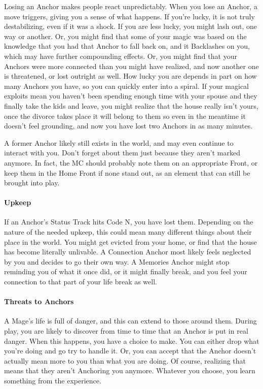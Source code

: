 \documentclass[
]{article}
\begin{document}
Losing an Anchor makes people react unpredictably. When you lose an
Anchor, a move triggers, giving you a sense of what happens. If you're
lucky, it is not truly destabilizing, even if it was a shock. If you are
less lucky, you might lash out, one way or another. Or, you might find
that some of your magic was based on the knowledge that you had that
Anchor to fall back on, and it Backlashes on you, which may have further
compounding effects. Or, you might find that your Anchors were more
connected than you might have realized, and now another one is
threatened, or lost outright as well. How lucky you are depends in part
on how many Anchors you have, so you can quickly enter into a spiral. If
your magical exploits mean you haven't been spending enough time with
your spouse and they finally take the kids and leave, you might realize
that the house really isn't yours, once the divorce takes place it will
belong to them so even in the meantime it doesn't feel grounding, and
now you have lost two Anchors in as many minutes.

A former Anchor likely still exists in the world, and may even continue
to interact with you. Don't forget about them just because they aren't
marked anymore. In fact, the MC should probably note them on an
appropriate Front, or keep them in the Home Front if none stand out, as
an element that can still be brought into play.

\hypertarget{upkeep}{%
\paragraph{Upkeep}\label{upkeep}}

If an Anchor's Status Track hits Code N, you have lost them. Depending
on the nature of the needed upkeep, this could mean many different
things about their place in the world. You might get evicted from your
home, or find that the house has become literally unlivable. A
Connection Anchor most likely feels neglected by you and decides to go
their own way. A Memories Anchor might stop reminding you of what it
once did, or it might finally break, and you feel your connection to
that part of your life break as well.

\hypertarget{threats-to-anchors}{%
\paragraph{Threats to Anchors}\label{threats-to-anchors}}

A Mage's life is full of danger, and this can extend to those around
them. During play, you are likely to discover from time to time that an
Anchor is put in real danger. When this happens, you have a choice to
make. You can either drop what you're doing and go try to handle it. Or,
you can accept that the Anchor doesn't actually mean more to you than
what you are doing. Of course, realizing that means that they aren't
Anchoring you anymore. Whatever you choose, you learn something from the
experience.
\end{document}
